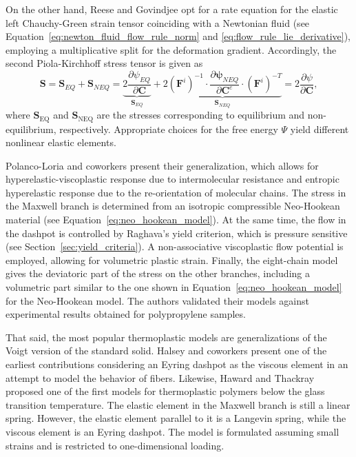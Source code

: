 On the other hand, Reese and Govindjee \citep{reeseTheoryFiniteViscoelasticity1998} opt for a rate equation for the elastic left Chauchy-Green strain tensor coinciding with a Newtonian fluid (see Equation~\eqref{eq:newton_fluid_flow_rule_norm} and \eqref{eq:flow_rule_lie_derivative}), employing a multiplicative split for the deformation gradient.
Accordingly, the second Piola-Kirchhoff stress tensor is given as
\begin{equation}
	\bm{S}=\bm{S}_{E Q}+\bm{S}_{N E Q}=\underbrace{2 \frac{\partial \psi_{E Q}}{\partial \bm{C}}}_{\bm{S}_{E Q}}+\underbrace{2 (\bm{F}^i)^{-1} \cdot \frac{\partial \bm{\psi}_{N E Q}}{\partial \bm{C}^e} \cdot (\bm{F}^i)^{-T}}_{\bm{S}_{N E Q}}=2 \frac{\partial \psi}{\partial \bm{C}},
\end{equation}
where $\bm S_\text{EQ}$ and $\bm S_\text{NEQ}$ are the stresses corresponding to equilibrium and non-equilibrium, respectively.
Appropriate choices for the free energy $\Psi$ yield different nonlinear elastic elements.

Polanco-Loria and coworkers \citep{polanco-loriaConstitutiveModelThermoplastics2010} present their generalization, which allows for hyperelastic-viscoplastic response due to intermolecular resistance and entropic hyperelastic response due to the re-orientation of molecular chains.
The stress in the Maxwell branch is determined from an isotropic compressible Neo-Hookean material (see Equation~\eqref{eq:neo_hookean_model}).
At the same time, the flow in the dashpot is controlled by Raghava's yield criterion, which is pressure sensitive (see Section~\ref{sec:yield_criteria}).
A non-associative viscoplastic flow potential is employed, allowing for volumetric plastic strain.
Finally, the eight-chain model gives the deviatoric part of the stress on the other branches, including a volumetric part similar to the one shown in Equation~\eqref{eq:neo_hookean_model} for the Neo-Hookean model.
The authors validated their models against experimental results obtained for polypropylene samples.

That said, the most popular thermoplastic models are generalizations of the Voigt version of the standard solid.
Halsey and coworkers \citep{halseyMechanicalPropertiesTextiles1945} present one of the earliest contributions considering an Eyring dashpot as the viscous element in an attempt to model the behavior of fibers.
Likewise, Haward and Thackray \citep{hawardUseMathematicalModel1968} proposed one of the first models for thermoplastic polymers below the glass transition temperature.
The elastic element in the Maxwell branch is still a linear spring.
However, the elastic element parallel to it is a Langevin spring, while the viscous element is an Eyring dashpot.
The model is formulated assuming small strains and is restricted to one-dimensional loading.

